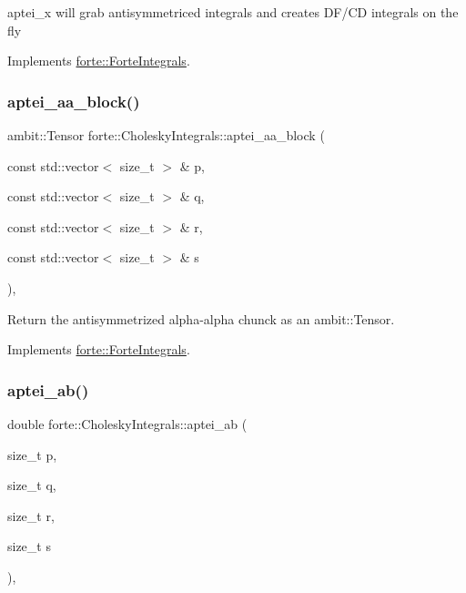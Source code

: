 aptei\+\_\+x will grab antisymmetriced integrals and creates D\+F/\+CD integrals on the fly 

Implements \mbox{\hyperlink{classforte_1_1_forte_integrals_afc84c157025b56ee0f8e3b1abe1c0a5f}{forte\+::\+Forte\+Integrals}}.

\mbox{\label{classforte_1_1_cholesky_integrals_aeaecb1b7275f8b9fc8b87b4a3b110fcd}} 
\subsubsection{\texorpdfstring{aptei\+\_\+aa\+\_\+block()}{aptei\_aa\_block()}}
{\footnotesize\ttfamily ambit\+::\+Tensor forte\+::\+Cholesky\+Integrals\+::aptei\+\_\+aa\+\_\+block (\begin{DoxyParamCaption}\item[{const std\+::vector$<$ size\+\_\+t $>$ \&}]{p,  }\item[{const std\+::vector$<$ size\+\_\+t $>$ \&}]{q,  }\item[{const std\+::vector$<$ size\+\_\+t $>$ \&}]{r,  }\item[{const std\+::vector$<$ size\+\_\+t $>$ \&}]{s }\end{DoxyParamCaption})\hspace{0.3cm}{\ttfamily [override]}, {\ttfamily [virtual]}}



Return the antisymmetrized alpha-\/alpha chunck as an ambit\+::\+Tensor. 



Implements \mbox{\hyperlink{classforte_1_1_forte_integrals_ac20ae649b8cfe116f8583d676e43da27}{forte\+::\+Forte\+Integrals}}.

\mbox{\label{classforte_1_1_cholesky_integrals_aba4876388a8b9b633f38af3fc1cb4227}} 
\subsubsection{\texorpdfstring{aptei\+\_\+ab()}{aptei\_ab()}}
{\footnotesize\ttfamily double forte\+::\+Cholesky\+Integrals\+::aptei\+\_\+ab (\begin{DoxyParamCaption}\item[{size\+\_\+t}]{p,  }\item[{size\+\_\+t}]{q,  }\item[{size\+\_\+t}]{r,  }\item[{size\+\_\+t}]{s }\end{DoxyParamCaption})\hspace{0.3cm}{\ttfamily [override]}, {\ttfamily [virtual]}}



